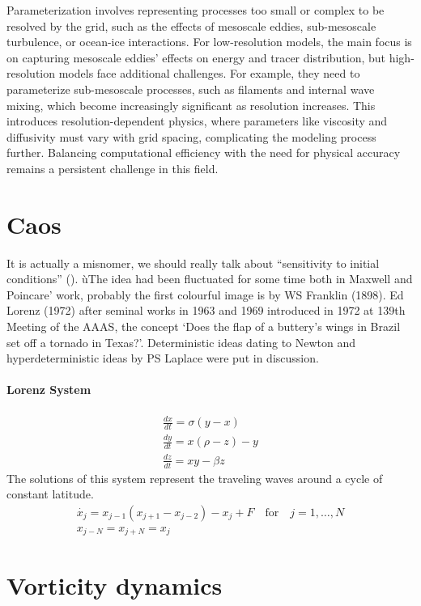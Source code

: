 Parameterization involves representing processes too small or complex to be resolved by the grid, such as the effects of mesoscale eddies, sub-mesoscale turbulence, or ocean-ice interactions. For low-resolution models, the main focus is on capturing mesoscale eddies' effects on energy and tracer distribution, but high-resolution models face additional challenges. For example, they need to parameterize sub-mesoscale processes, such as filaments and internal wave mixing, which become increasingly significant as resolution increases. This introduces resolution-dependent physics, where parameters like viscosity and diffusivity must vary with grid spacing, complicating the modeling process further. Balancing computational efficiency with the need for physical accuracy remains a persistent challenge in this field.

\section{Caos}
It is actually a misnomer, we should really talk about “sensitivity to initial conditions” (\cite{chaosbook}).
ùThe idea had been fluctuated for some time both in Maxwell and Poincare’ work, probably the first colourful image is by WS Franklin (1898). Ed Lorenz (1972) after seminal works in 1963 and 1969 introduced in 1972 at 139th Meeting of the AAAS, the concept ‘Does the flap of a buttery’s wings in Brazil set off a tornado in Texas?’.
Deterministic ideas dating to Newton and hyperdeterministic ideas by PS Laplace were put in discussion.
\paragraph{Lorenz System}
\begin{align}\label{eq.lorenz system}
	\frac{dx}{dt}=\sigma(y-x) \\
	\frac{dy}{dt}=x(\rho-z)-y \\
	\frac{dz}{dt}=xy-\beta z
\end{align}
The solutions of this system represent the traveling waves around a cycle of constant latitude.
\begin{align*}
	\dot{x_j}=x_{j-1}(x_{j+1}-x_{j-2})-x_j+F \quad \text{for} \quad j=1,\dots,N \\
	x_{j-N}=x_{j+N}=x_j
\end{align*}
\section{Vorticity dynamics}
